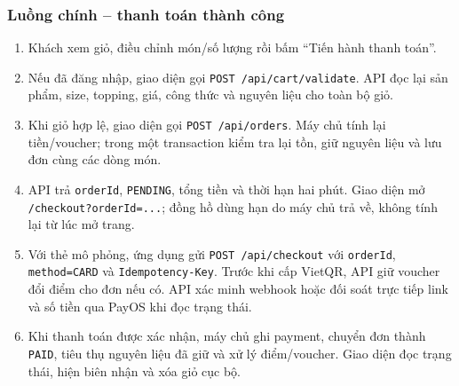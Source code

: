 \subsubsection{Luồng chính -- thanh toán thành công}
\begin{enumerate}[leftmargin=2.2em]
  \item Khách xem giỏ, điều chỉnh món/số lượng rồi bấm ``Tiến hành thanh toán''.
  \item Nếu đã đăng nhập, giao diện gọi \texttt{POST /api/cart/validate}. API đọc lại sản phẩm, size, topping, giá, công thức và nguyên liệu cho toàn bộ giỏ.
  \item Khi giỏ hợp lệ, giao diện gọi \texttt{POST /api/orders}. Máy chủ tính lại tiền/voucher; trong một transaction kiểm tra lại tồn, giữ nguyên liệu và lưu đơn cùng các dòng món.
  \item API trả \texttt{orderId}, \texttt{PENDING}, tổng tiền và thời hạn hai phút. Giao diện mở \nolinkurl{/checkout?orderId=...}; đồng hồ dùng hạn do máy chủ trả về, không tính lại từ lúc mở trang.
  \item Với thẻ mô phỏng, ứng dụng gửi \texttt{POST /api/checkout} với \texttt{orderId}, \texttt{method=CARD} và \texttt{Idempotency-Key}. Trước khi cấp VietQR, API giữ voucher đổi điểm cho đơn nếu có. API xác minh webhook hoặc đối soát trực tiếp link và số tiền qua PayOS khi đọc trạng thái.
  \item Khi thanh toán được xác nhận, máy chủ ghi payment, chuyển đơn thành \texttt{PAID}, tiêu thụ nguyên liệu đã giữ và xử lý điểm/voucher. Giao diện đọc trạng thái, hiện biên nhận và xóa giỏ cục bộ.
\end{enumerate}

